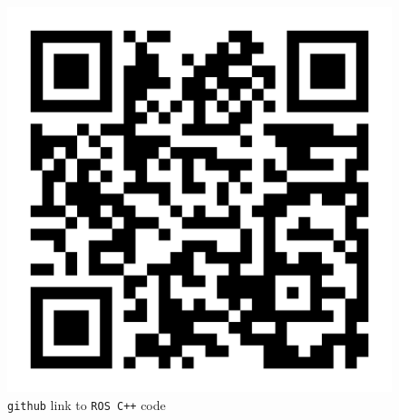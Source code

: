 \begin{frame}{}

\begin{figure}[t!] \centering
        \includegraphics[scale=0.15,frame]{./figures/05/cbgl_github.png}
        \caption{\texttt{github} link to \texttt{ROS C++} code}
\end{figure}

\end{frame}
